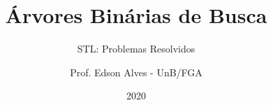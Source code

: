 \title{Árvores Binárias de Busca}
\subtitle{STL: Problemas Resolvidos}
\author{Prof. Edson Alves - UnB/FGA}
\date{2020}
